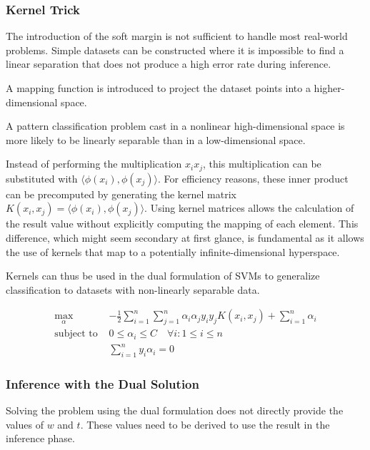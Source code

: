 \subsubsection{Kernel Trick}

The introduction of the soft margin is not sufficient to handle most real-world problems. Simple datasets can be constructed where it is impossible to find a linear separation that does not produce a high error rate during inference.

A mapping function is introduced to project the dataset points into a higher-dimensional space.

\begin{theorem}[Cover]
  A pattern classification problem cast in a nonlinear high-dimensional space is more likely to be linearly separable than in a low-dimensional space\cite{ThCover}.
\end{theorem}

Instead of performing the multiplication $x_ix_j$, this multiplication can be substituted with $\langle\phi(x_i), \phi(x_j)\rangle$. For efficiency reasons, these inner product can be precomputed by generating the kernel matrix $K(x_i, x_j) = \langle\phi(x_i),\phi(x_j)\rangle$. Using kernel matrices allows the calculation of the result value without explicitly computing the mapping of each element. This difference, which might seem secondary at first glance, is fundamental as it allows the use of kernels that map to a potentially infinite-dimensional hyperspace.

Kernels can thus be used in the dual formulation of SVMs to generalize classification to datasets with non-linearly separable data.

\begin{align*}
    \max_\alpha\ & -\frac{1}{2}\sum_{i=1}^n\sum_{j=1}^n\alpha_i\alpha_jy_iy_jK(x_i, x_j) + \sum_{i=1}^n
  \alpha_i \\
    \text{subject to } & 0 \leq \alpha_i \leq C \quad \forall i: 1\leq i\leq n \\
    & \sum_{i=1}^ny_i\alpha_i=0
\end{align*}

\subsubsection{Inference with the Dual Solution}

Solving the problem using the dual formulation does not directly provide the values of $w$ and $t$. These values need to be derived to use the result in the inference phase.

